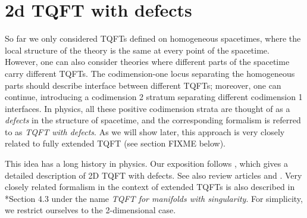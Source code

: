 \chapter{2d TQFT with defects}\label{c:2d-defects}


So far we only considered TQFTs defined on homogeneous spacetimes, where the
local structure of the theory is the same at every point of the spacetime.
However, one can also consider theories where different parts of the spacetime
carry different TQFTs. The codimension-one locus separating the homogeneous
parts should describe interface between different TQFTs; moreover, one can
continue, introducing a codimension 2 stratum separating different codimension
1 interfaces. In physics, all these positive codimension strata are thought of
as a \emph{defects} in the structure of spacetime, and the
corresponding formalism is referred to as \emph{TQFT with
defects}. As we will show later, this approach
is very closely related to fully extended TQFT (see section FIXME below).

This idea has a long history in physics. Our exposition follows  ,
which gives a detailed description of 2D TQFT with defects. See also review
articles  and . Very closely related formalism in
the context of extended TQFTs is also described in *{Section 4.3}
under the name \emph{TQFT for manifolds with singularity}. For simplicity, we
restrict ourselves to the 2-dimensional case.

